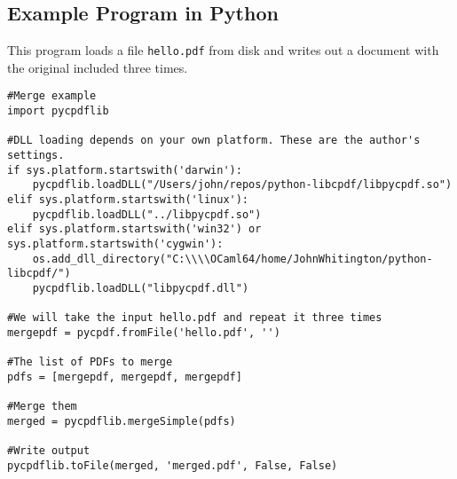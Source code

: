 \documentclass{book}
\begin{document}
\begin{pycpdflib}
\chapter*{Example Program in Python}

This program loads a file \texttt{hello.pdf} from disk and writes out a
document with the original included three times.

\begin{small}
\begin{verbatim}
#Merge example
import pycpdflib

#DLL loading depends on your own platform. These are the author's settings.
if sys.platform.startswith('darwin'):
    pycpdflib.loadDLL("/Users/john/repos/python-libcpdf/libpycpdf.so")
elif sys.platform.startswith('linux'):
    pycpdflib.loadDLL("../libpycpdf.so")
elif sys.platform.startswith('win32') or sys.platform.startswith('cygwin'):
    os.add_dll_directory("C:\\\\OCaml64/home/JohnWhitington/python-libcpdf/")
    pycpdflib.loadDLL("libpycpdf.dll")

#We will take the input hello.pdf and repeat it three times
mergepdf = pycpdf.fromFile('hello.pdf', '')

#The list of PDFs to merge
pdfs = [mergepdf, mergepdf, mergepdf]

#Merge them
merged = pycpdflib.mergeSimple(pdfs)

#Write output
pycpdflib.toFile(merged, 'merged.pdf', False, False)
\end{verbatim}
\end{small}
\end{pycpdflib}

\pagestyle{plain}
\tableofcontents\clearpage\pagestyle{empty}

\cleardoublepage
\pagestyle{plain}
\end{document}
